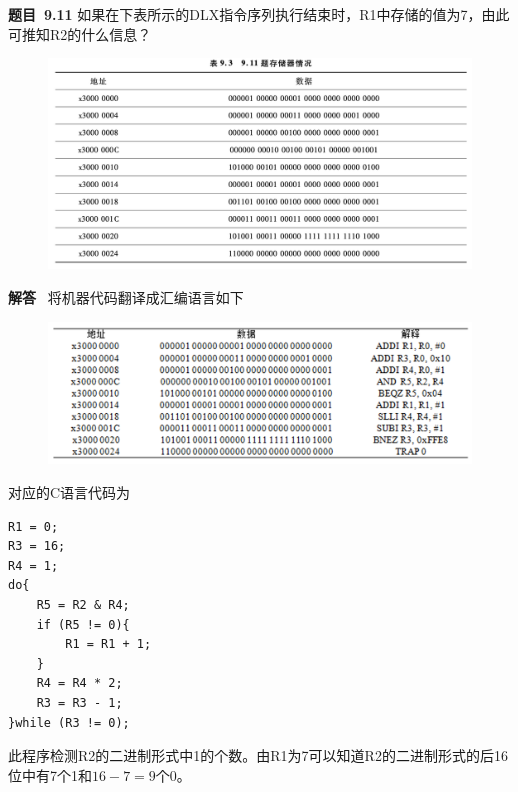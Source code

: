 \documentclass[10pt,a4paper,UTF8]{ctexart}
\newcommand{\problemname}{待定义}
\newenvironment{problem}{\begin{shaded}\par\noindent\textbf{题目\  \problemname}}{\end{shaded}\par}
\newenvironment{solution}{\par\noindent\textbf{解答}\ }{\par}
\begin{document}
\renewcommand{\problemname}{9.11}
\begin{problem}
	如果在下表所示的DLX指令序列执行结束时，R1中存储的值为7，由此可推知R2的什么信息？
\end{problem}

\begin{figure}[H]
	\centering
	\includegraphics[scale=0.5]{img/9.11}
\end{figure}

\begin{solution}
	将机器代码翻译成汇编语言如下
	\begin{figure}[H]
		\centering
		\includegraphics[scale=0.45]{img/9.11a}
	\end{figure}
	对应的C语言代码为
	\lstset{language=C}
	\begin{lstlisting}
R1 = 0;
R3 = 16;
R4 = 1;
do{
	R5 = R2 & R4;
	if (R5 != 0){
		R1 = R1 + 1;
	}
	R4 = R4 * 2;
	R3 = R3 - 1;
}while (R3 != 0);
	\end{lstlisting}

	此程序检测R2的二进制形式中1的个数。由R1为7可以知道R2的二进制形式的后16位中有7个1和$16-7=9$个0。
\end{solution}
\end{document}
